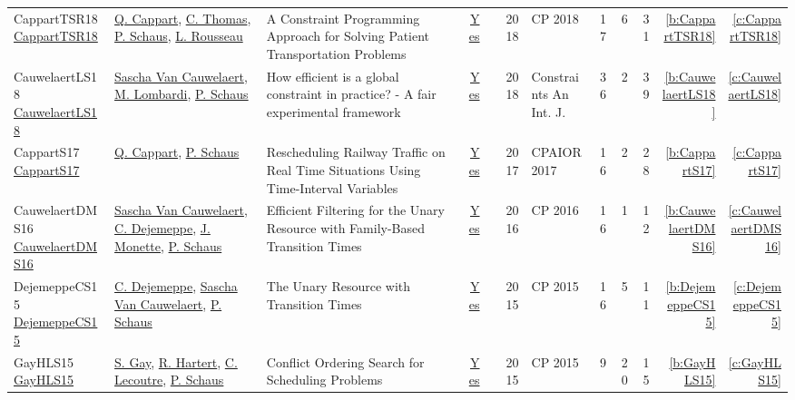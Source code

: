 {\begin{longtable}{>{\raggedright\arraybackslash}p{3cm}>{\raggedright\arraybackslash}p{6cm}>{\raggedright\arraybackslash}p{6.5cm}rrrp{2.5cm}rrrrr}
CappartTSR18 \href{https://doi.org/10.1007/978-3-319-98334-9\_32}{CappartTSR18} & \hyperref[auth:a42]{Q. Cappart}, \hyperref[auth:a847]{C. Thomas}, \hyperref[auth:a148]{P. Schaus}, \hyperref[auth:a332]{L. Rousseau} & A Constraint Programming Approach for Solving Patient Transportation Problems & \href{works/CappartTSR18.pdf}{Yes} & \cite{CappartTSR18} & 2018 & CP 2018 & 17 & 6 & 31 & \ref{b:CappartTSR18} & \ref{c:CappartTSR18}\\
CauwelaertLS18 \href{https://doi.org/10.1007/s10601-017-9277-y}{CauwelaertLS18} & \hyperref[auth:a207]{Sascha Van Cauwelaert}, \hyperref[auth:a143]{M. Lombardi}, \hyperref[auth:a148]{P. Schaus} & How efficient is a global constraint in practice? - {A} fair experimental framework & \href{works/CauwelaertLS18.pdf}{Yes} & \cite{CauwelaertLS18} & 2018 & Constraints An Int. J. & 36 & 2 & 39 & \ref{b:CauwelaertLS18} & \ref{c:CauwelaertLS18}\\
CappartS17 \href{https://doi.org/10.1007/978-3-319-59776-8\_26}{CappartS17} & \hyperref[auth:a42]{Q. Cappart}, \hyperref[auth:a148]{P. Schaus} & Rescheduling Railway Traffic on Real Time Situations Using Time-Interval Variables & \href{works/CappartS17.pdf}{Yes} & \cite{CappartS17} & 2017 & CPAIOR 2017 & 16 & 2 & 28 & \ref{b:CappartS17} & \ref{c:CappartS17}\\
CauwelaertDMS16 \href{https://doi.org/10.1007/978-3-319-44953-1\_33}{CauwelaertDMS16} & \hyperref[auth:a207]{Sascha Van Cauwelaert}, \hyperref[auth:a208]{C. Dejemeppe}, \hyperref[auth:a150]{J. Monette}, \hyperref[auth:a148]{P. Schaus} & Efficient Filtering for the Unary Resource with Family-Based Transition Times & \href{works/CauwelaertDMS16.pdf}{Yes} & \cite{CauwelaertDMS16} & 2016 & CP 2016 & 16 & 1 & 12 & \ref{b:CauwelaertDMS16} & \ref{c:CauwelaertDMS16}\\
DejemeppeCS15 \href{https://doi.org/10.1007/978-3-319-23219-5\_7}{DejemeppeCS15} & \hyperref[auth:a208]{C. Dejemeppe}, \hyperref[auth:a207]{Sascha Van Cauwelaert}, \hyperref[auth:a148]{P. Schaus} & The Unary Resource with Transition Times & \href{works/DejemeppeCS15.pdf}{Yes} & \cite{DejemeppeCS15} & 2015 & CP 2015 & 16 & 5 & 11 & \ref{b:DejemeppeCS15} & \ref{c:DejemeppeCS15}\\
GayHLS15 \href{https://doi.org/10.1007/978-3-319-23219-5\_10}{GayHLS15} & \hyperref[auth:a217]{S. Gay}, \hyperref[auth:a218]{R. Hartert}, \hyperref[auth:a219]{C. Lecoutre}, \hyperref[auth:a148]{P. Schaus} & Conflict Ordering Search for Scheduling Problems & \href{works/GayHLS15.pdf}{Yes} & \cite{GayHLS15} & 2015 & CP 2015 & 9 & 20 & 15 & \ref{b:GayHLS15} & \ref{c:GayHLS15}\\

\end{longtable}}
